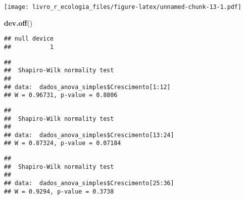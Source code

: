 \documentclass[
]{book}
\newenvironment{Shaded}{\begin{snugshade}}{\end{snugshade}}
\newcommand{\CommentTok}[1]{\textcolor[rgb]{0.56,0.35,0.01}{\textit{#1}}}
\newcommand{\DecValTok}[1]{\textcolor[rgb]{0.00,0.00,0.81}{#1}}
\newcommand{\KeywordTok}[1]{\textcolor[rgb]{0.13,0.29,0.53}{\textbf{#1}}}
\newcommand{\NormalTok}[1]{#1}
\newcommand{\OperatorTok}[1]{\textcolor[rgb]{0.81,0.36,0.00}{\textbf{#1}}}
\begin{document}
\texttt{[image: livro\_r\_ecologia\_files/figure-latex/unnamed-chunk-13-1.pdf]}

\begin{Shaded}
\begin{Highlighting}[]
\KeywordTok{dev.off}\NormalTok{()}
\end{Highlighting}
\end{Shaded}

\begin{verbatim}
## null device 
##           1
\end{verbatim}

\begin{Shaded}
\end{Shaded}

\begin{verbatim}
## 
## 	Shapiro-Wilk normality test
## 
## data:  dados_anova_simples$Crescimento[1:12]
## W = 0.96731, p-value = 0.8806
\end{verbatim}

\begin{Shaded}
\end{Shaded}

\begin{verbatim}
## 
## 	Shapiro-Wilk normality test
## 
## data:  dados_anova_simples$Crescimento[13:24]
## W = 0.87324, p-value = 0.07184
\end{verbatim}

\begin{Shaded}
\end{Shaded}

\begin{verbatim}
## 
## 	Shapiro-Wilk normality test
## 
## data:  dados_anova_simples$Crescimento[25:36]
## W = 0.9294, p-value = 0.3738
\end{verbatim}
\end{document}
